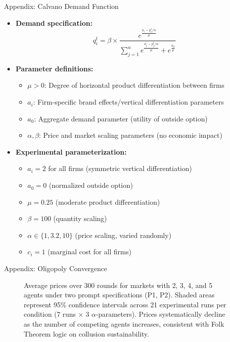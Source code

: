 \documentclass[10pt, aspectratio=169]{beamer}
\begin{document}
\begin{frame}{Appendix: Calvano Demand Function}\label{app:calvano}
    \begin{itemize}
        \item \textbf{Demand specification:}
        $$q_i^t = \beta \times \frac{e^{\frac{a_i - p_i^t/\alpha}{\mu}}}{\sum_{j=1}^{n} e^{\frac{a_j - p_j^t/\alpha}{\mu}} + e^{\frac{a_0}{\mu}}}$$
        
        \item \textbf{Parameter definitions:}
        \begin{itemize}
            \item $\mu > 0$: Degree of horizontal product differentiation between firms
            \item $a_i$: Firm-specific brand effects/vertical differentiation parameters
            \item $a_0$: Aggregate demand parameter (utility of outside option)
            \item $\alpha, \beta$: Price and market scaling parameters (no economic impact)
        \end{itemize}
        
        \item \textbf{Experimental parameterization:}
        \begin{itemize}
            \item $a_i = 2$ for all firms (symmetric vertical differentiation)
            \item $a_0 = 0$ (normalized outside option)
            \item $\mu = 0.25$ (moderate product differentiation)
            \item $\beta = 100$ (quantity scaling)
            \item $\alpha \in \{1, 3.2, 10\}$ (price scaling, varied randomly)
            \item $c_i = 1$ (marginal cost for all firms) \hfill{}
        \end{itemize}
    \end{itemize}
\end{frame}

\begin{frame}{Appendix: Oligopoly Convergence \hyperlink{slide:titfortat}{}}\label{app:convergence}
    \begin{figure}[htpb!]
        \centering
        
        \caption{Average prices over 300 rounds for markets with 2, 3, 4, and 5 agents under two prompt specifications (P1, P2). Shaded areas represent 95\% confidence intervals across 21 experimental runs per condition (7 runs × 3 $\alpha$-parameters). Prices systematically decline as the number of competing agents increases, consistent with Folk Theorem logic on collusion sustainability.}
        \label{fig:ts_prices_comb}
    \end{figure}
    
\end{frame}
\end{document}
